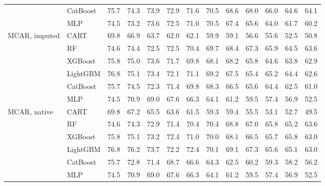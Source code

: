 \documentclass[pdflatex,sn-mathphys]{sn-jnl}
\theoremstyle{thmstyleone}
\begin{document}
\begin{table}[htbp]
\begin{tabular}{@{}llrrrrrrrrrrr@{}}
 & CatBoost & 75.7 & 74.3 & 73.9 & 72.9 & 71.6 & 70.5 & 68.6 & 68.0 & 66.0 & 64.6 & 64.1 \\
 & MLP & 74.5 & 73.2 & 73.6 & 72.5 & 71.0 & 70.5 & 67.4 & 65.6 & 64.0 & 61.7 & 60.2 \\
\midrule
MCAR, imputed & CART & 69.8 & 66.9 & 63.7 & 62.0 & 62.1 & 59.9 & 59.1 & 56.6 & 55.6 & 52.5 & 50.8 \\
 & RF & 74.6 & 74.4 & 72.5 & 72.5 & 70.4 & 69.7 & 68.4 & 67.3 & 65.9 & 64.5 & 63.6 \\
 & XGBoost & 75.8 & 75.0 & 73.6 & 71.7 & 69.8 & 68.1 & 68.2 & 65.8 & 64.6 & 63.8 & 62.9 \\
 & LightGBM & 76.8 & 75.1 & 73.4 & 72.1 & 71.1 & 69.2 & 67.5 & 65.4 & 65.2 & 64.4 & 62.6 \\
 & CatBoost & 75.7 & 74.5 & 72.3 & 71.4 & 69.8 & 68.3 & 66.5 & 65.6 & 64.4 & 62.5 & 61.0 \\
 & MLP & 74.5 & 70.9 & 69.0 & 67.6 & 66.3 & 64.1 & 61.2 & 59.5 & 57.4 & 56.9 & 52.5 \\
\midrule
MCAR, native & CART & 69.8 & 67.2 & 65.5 & 63.6 & 61.5 & 59.3 & 59.4 & 55.5 & 53.1 & 52.7 & 49.5 \\
 & RF & 74.6 & 74.3 & 72.9 & 71.4 & 70.4 & 70.4 & 68.8 & 67.0 & 65.8 & 65.2 & 63.6 \\
 & XGBoost & 75.8 & 75.1 & 73.2 & 72.4 & 71.0 & 70.0 & 68.1 & 66.5 & 65.7 & 65.8 & 63.0 \\
 & LightGBM & 76.8 & 76.2 & 73.7 & 72.2 & 72.4 & 70.1 & 69.1 & 67.3 & 65.6 & 65.1 & 63.0 \\
 & CatBoost & 75.7 & 72.8 & 71.4 & 68.7 & 66.6 & 64.3 & 62.5 & 60.2 & 59.3 & 58.2 & 56.2 \\
 & MLP & 74.5 & 70.9 & 69.0 & 67.6 & 66.3 & 64.1 & 61.2 & 59.5 & 57.4 & 56.9 & 52.5 \\
\bottomrule
\end{tabular}
\end{table}
\end{document}
